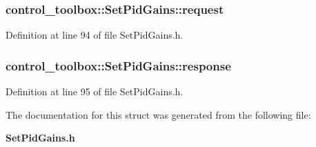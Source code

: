 \subsubsection[{request}]{ {\bf control\-\_\-toolbox\-::\-Set\-Pid\-Gains\-::request}}\label{structcontrol__toolbox_1_1SetPidGains_af0c28d52e57d22f5c5d9c4c4d1fe0f7f}


\-Definition at line 94 of file \-Set\-Pid\-Gains.\-h.

\subsubsection[{response}]{ {\bf control\-\_\-toolbox\-::\-Set\-Pid\-Gains\-::response}}\label{structcontrol__toolbox_1_1SetPidGains_a54df9ae9b113f75cbd37542807c9729f}


\-Definition at line 95 of file \-Set\-Pid\-Gains.\-h.



\-The documentation for this struct was generated from the following file\-:\begin{DoxyCompactItemize}
\item 
{\bf \-Set\-Pid\-Gains.\-h}\end{DoxyCompactItemize}
